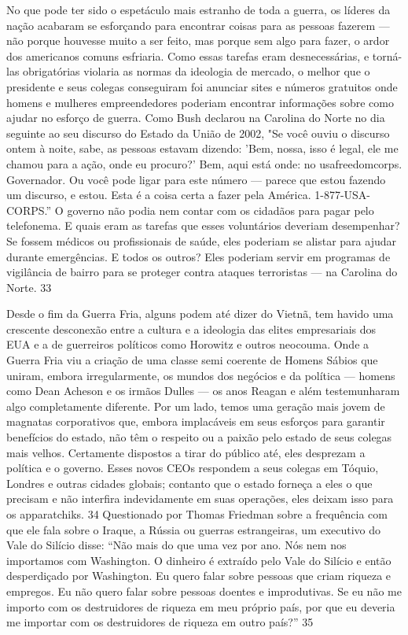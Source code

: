  
\par
 
No que pode ter sido o espetáculo mais estranho de toda a guerra, os líderes da nação acabaram se esforçando para encontrar coisas para as pessoas fazerem — não porque houvesse muito a ser feito, mas porque sem algo para fazer, o ardor dos americanos comuns esfriaria. Como essas tarefas eram desnecessárias, e torná-las obrigatórias violaria as normas da ideologia de mercado, o melhor que o presidente e seus colegas conseguiram foi anunciar sites e números gratuitos onde homens e mulheres empreendedores poderiam encontrar informações sobre como ajudar no esforço de guerra. Como Bush declarou na Carolina do Norte no dia seguinte ao seu discurso do Estado da União de 2002, "Se você ouviu o discurso ontem à noite, sabe, as pessoas estavam dizendo: 'Bem, nossa, isso é legal, ele me chamou para a ação, onde eu procuro?' Bem, aqui está onde: no usafreedomcorps. Governador. Ou você pode ligar para este número — parece que estou fazendo um discurso, e estou. Esta é a coisa certa a fazer pela América. 1-877-USA- CORPS.” O governo não podia nem contar com os cidadãos para pagar pelo telefonema. E quais eram as tarefas que esses voluntários deveriam desempenhar? Se fossem médicos ou profissionais de saúde, eles poderiam se alistar para ajudar durante emergências. E todos os outros? Eles poderiam servir em programas de vigilância de bairro para se proteger contra ataques terroristas — na Carolina do Norte.
 {\color{blue} 33}  

 
\par
 
Desde o fim da Guerra Fria, alguns podem até dizer do Vietnã, tem havido uma crescente desconexão entre a cultura e a ideologia das elites empresariais dos EUA e a de guerreiros políticos como Horowitz e outros neocouma. Onde a Guerra Fria viu a criação de uma classe semi coerente de Homens Sábios que uniram, embora irregularmente, os mundos dos negócios e da política — homens como Dean Acheson e os irmãos Dulles — os anos Reagan e além testemunharam algo completamente diferente. Por um lado, temos uma geração mais jovem de magnatas corporativos que, embora implacáveis ​​em seus esforços para garantir benefícios do estado, não têm o respeito ou a paixão pelo estado de seus colegas mais velhos. Certamente dispostos a tirar do público até, eles desprezam a política e o governo. Esses novos CEOs respondem a seus colegas em Tóquio, Londres e outras cidades globais; contanto que o estado forneça a eles o que precisam e não interfira indevidamente em suas operações, eles deixam isso para os apparatchiks.
 {\color{blue} 34}  
Questionado por Thomas Friedman sobre a frequência com que ele fala sobre o Iraque, a Rússia ou guerras estrangeiras, um executivo do Vale do Silício disse: “Não mais do que uma vez por ano. Nós nem nos importamos com Washington. O dinheiro é extraído pelo Vale do Silício e então desperdiçado por Washington. Eu quero falar sobre pessoas que criam riqueza e empregos. Eu não quero falar sobre pessoas doentes e improdutivas. Se eu não me importo com os destruidores de riqueza em meu próprio país, por que eu deveria me importar com os destruidores de riqueza em outro país?”
 {\color{blue} 35}  

